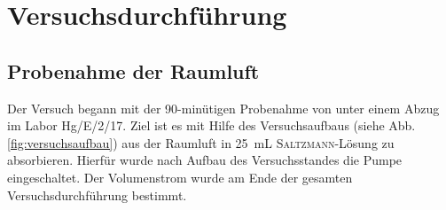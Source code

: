 \newpage
\section{Versuchsdurchführung}
\label{sec:durchfuerung}

\subsection*{Probenahme der Raumluft}
Der Versuch begann mit der 90-minütigen Probenahme von  unter einem Abzug im Labor Hg/E/2/17. 
Ziel ist es mit Hilfe des Versuchsaufbaus (siehe Abb. \ref{fig:versuchsaufbau})  aus der Raumluft in \SI{25}{\milli \liter} \textsc{Saltzmann}-Lösung zu absorbieren.
Hierfür wurde nach Aufbau des Versuchsstandes die Pumpe eingeschaltet. Der Volumenstrom wurde am Ende der gesamten Versuchsdurchführung bestimmt.


